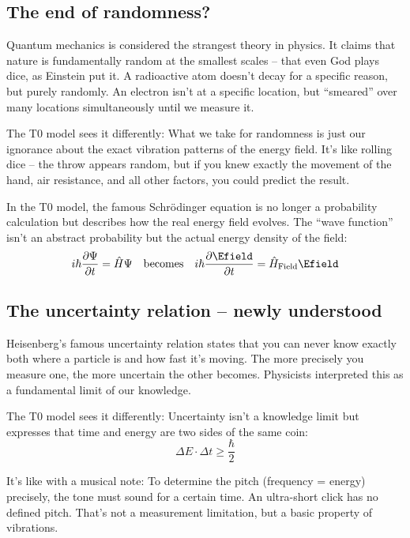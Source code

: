 	\subsection{The end of randomness?}
	
	Quantum mechanics is considered the strangest theory in physics. It claims that nature is fundamentally random at the smallest scales -- that even God plays dice, as Einstein put it. A radioactive atom doesn't decay for a specific reason, but purely randomly. An electron isn't at a specific location, but ``smeared'' over many locations simultaneously until we measure it.
	
	The T0 model sees it differently: What we take for randomness is just our ignorance about the exact vibration patterns of the energy field. It's like rolling dice -- the throw appears random, but if you knew exactly the movement of the hand, air resistance, and all other factors, you could predict the result.
	
	\begin{tcolorbox}
		In the T0 model, the famous Schrödinger equation is no longer a probability calculation but describes how the real energy field evolves. The ``wave function'' isn't an abstract probability but the actual energy density of the field:
		\begin{equation}
			i\hbar \frac{\partial \Psi}{\partial t} = \hat{H}\Psi \quad \text{becomes} \quad i\hbar \frac{\partial \Efield}{\partial t} = \hat{H}_{\text{Field}}\Efield
		\end{equation}
	\end{tcolorbox}
	
	\subsection{The uncertainty relation -- newly understood}
	
	Heisenberg's famous uncertainty relation states that you can never know exactly both where a particle is and how fast it's moving. The more precisely you measure one, the more uncertain the other becomes. Physicists interpreted this as a fundamental limit of our knowledge.
	
	The T0 model sees it differently: Uncertainty isn't a knowledge limit but expresses that time and energy are two sides of the same coin:
	\begin{equation}
		\Delta E \cdot \Delta t \geq \frac{\hbar}{2}
	\end{equation}
	
	It's like with a musical note: To determine the pitch (frequency = energy) precisely, the tone must sound for a certain time. An ultra-short click has no defined pitch. That's not a measurement limitation, but a basic property of vibrations.
	
